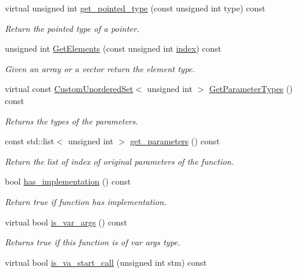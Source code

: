 \begin{DoxyCompactItemize}
virtual unsigned int \hyperlink{classBehavioralHelper_a19d53544a2afa3c307cb84725748d54c}{get\+\_\+pointed\+\_\+type} (const unsigned int type) const
\begin{DoxyCompactList}\small\item\em Return the pointed type of a pointer. \end{DoxyCompactList}\item 
unsigned int \hyperlink{classBehavioralHelper_a2966a26651cad6597705927691d8af6e}{Get\+Elements} (const unsigned int \hyperlink{tutorial__pact__2019_2Introduction_2third_2include_2Keccak_8h_a028c9bdc8344cca38ab522a337074797}{index}) const
\begin{DoxyCompactList}\small\item\em Given an array or a vector return the element type. \end{DoxyCompactList}\item 
virtual const \hyperlink{classCustomUnorderedSet}{Custom\+Unordered\+Set}$<$ unsigned int $>$ \hyperlink{classBehavioralHelper_a8f8fdd077000ffb5326af5d5bad2c664}{Get\+Parameter\+Types} () const
\begin{DoxyCompactList}\small\item\em Returns the types of the parameters. \end{DoxyCompactList}\item 
const std\+::list$<$ unsigned int $>$ \hyperlink{classBehavioralHelper_a610334c66bf0ac0813878674181ae8ce}{get\+\_\+parameters} () const
\begin{DoxyCompactList}\small\item\em Return the list of index of original parameters of the function. \end{DoxyCompactList}\item 
bool \hyperlink{classBehavioralHelper_a4b693bb37cb6ebe5af1d0e8b41ee847a}{has\+\_\+implementation} () const
\begin{DoxyCompactList}\small\item\em Return true if function has implementation. \end{DoxyCompactList}\item 
virtual bool \hyperlink{classBehavioralHelper_adc713dd555c80762dbbc0f4fbe052ce9}{is\+\_\+var\+\_\+args} () const
\begin{DoxyCompactList}\small\item\em Returns true if this function is of var args type. \end{DoxyCompactList}\item 
virtual bool \hyperlink{classBehavioralHelper_a48be8bee053a0b3d8e4f37b7f249ced2}{is\+\_\+va\+\_\+start\+\_\+call} (unsigned int stm) const

\end{DoxyCompactItemize}
